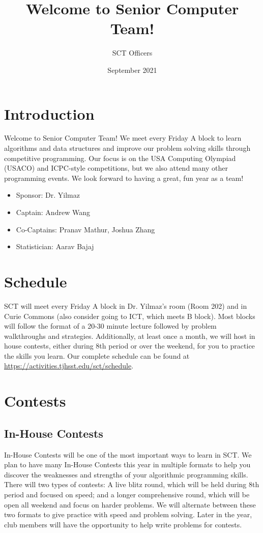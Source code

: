 \documentclass[11pt]{article}
\title{Welcome to Senior Computer Team!}
\author{SCT Officers}
\date{September 2021}
\begin{document}
\maketitle

\section{Introduction}
    Welcome to Senior Computer Team! We meet every Friday A block to learn algorithms and data structures and improve our problem solving skills through competitive programming. Our focus is on the USA Computing Olympiad (USACO) and ICPC-style competitions, but we also attend many other programming events. We look forward to having a great, fun year as a team! 
    
    
\begin{itemize}
  \item Sponsor: Dr. Yilmaz
  \item Captain: Andrew Wang
  \item Co-Captains: Pranav Mathur, Joshua Zhang
  \item Statistician: Aarav Bajaj
\end{itemize}

\section{Schedule}
    SCT will meet every Friday A block in Dr. Yilmaz's room (Room 202) and in Curie Commons (also consider going to ICT, which meets B block). Most blocks will follow the format of a 20-30 minute lecture followed by problem walkthroughs and strategies. Additionally, at least once a month, we will host in house contests, either during 8th period or over the weekend, for you to practice the skills you learn. Our complete schedule can be found at \url{https://activities.tjhsst.edu/sct/schedule}.
    
\section{Contests}
\subsection{In-House Contests}
       In-House Contests will be one of the most important ways to learn in SCT. We plan to have many In-House Contests this year in multiple formats to help you discover the weaknesses and strengths of your algorithmic programming skills. There will two types of contests: A live blitz round, which will be held during 8th period and focused on speed; and a longer comprehensive round, which will be open all weekend and focus on harder problems. We will alternate between these two formats to give practice with speed and problem solving. Later in the year, club members will have the opportunity to help write problems for contests.
\end{document}
